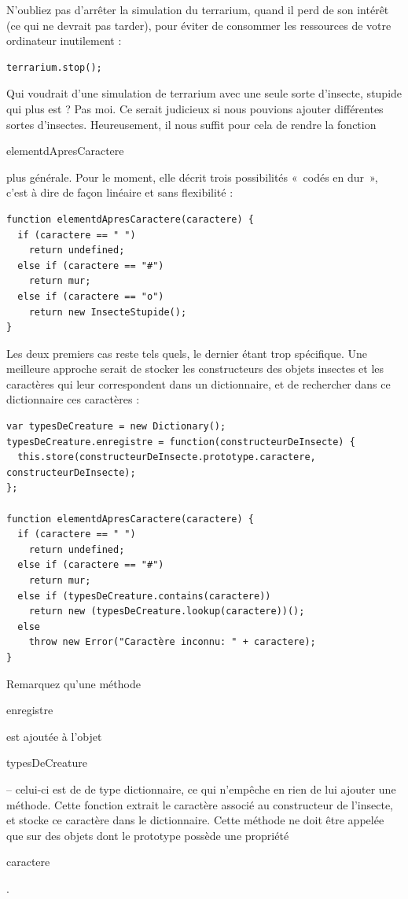 \documentclass{FramateX}
\renewcommand{\texttt}[1]{\begin{sffamily}{#1}\end{sffamily}}
\begin{document}
N'oubliez pas d'arrêter la simulation du terrarium, quand il perd de son
intérêt (ce qui ne devrait pas tarder), pour éviter de consommer les
ressources de votre ordinateur inutilement :

\begin{lstlisting}
terrarium.stop();
\end{lstlisting}
\begin{center}\end{center}

Qui voudrait d'une simulation de terrarium avec une seule sorte
d'insecte, stupide qui plus est ? Pas moi. Ce serait judicieux si nous
pouvions ajouter différentes sortes d'insectes. Heureusement, il nous
suffit pour cela de rendre la fonction \texttt{elementdApresCaractere}
plus générale. Pour le moment, elle décrit trois possibilités «~codés en
dur~», c'est à dire de façon linéaire et sans flexibilité :

\begin{lstlisting}
function elementdApresCaractere(caractere) {
  if (caractere == " ")
    return undefined;
  else if (caractere == "#")
    return mur;
  else if (caractere == "o")
    return new InsecteStupide();
}
\end{lstlisting}
Les deux premiers cas reste tels quels, le dernier étant trop
spécifique. Une meilleure approche serait de stocker les constructeurs
des objets insectes et les caractères qui leur correspondent dans un
dictionnaire, et de rechercher dans ce dictionnaire ces caractères :

\begin{lstlisting}
var typesDeCreature = new Dictionary();
typesDeCreature.enregistre = function(constructeurDeInsecte) {
  this.store(constructeurDeInsecte.prototype.caractere, constructeurDeInsecte);
};

function elementdApresCaractere(caractere) {
  if (caractere == " ")
    return undefined;
  else if (caractere == "#")
    return mur;
  else if (typesDeCreature.contains(caractere))
    return new (typesDeCreature.lookup(caractere))();
  else
    throw new Error("Caractère inconnu: " + caractere);
}
\end{lstlisting}
Remarquez qu'une méthode \texttt{enregistre} est ajoutée à l'objet
\texttt{typesDeCreature} -- celui-ci est de de type dictionnaire, ce qui
n'empêche en rien de lui ajouter une méthode. Cette fonction extrait le
caractère associé au constructeur de l'insecte, et stocke ce caractère
dans le dictionnaire. Cette méthode ne doit être appelée que sur des
objets dont le prototype possède une propriété \texttt{caractere}.
\end{document}
